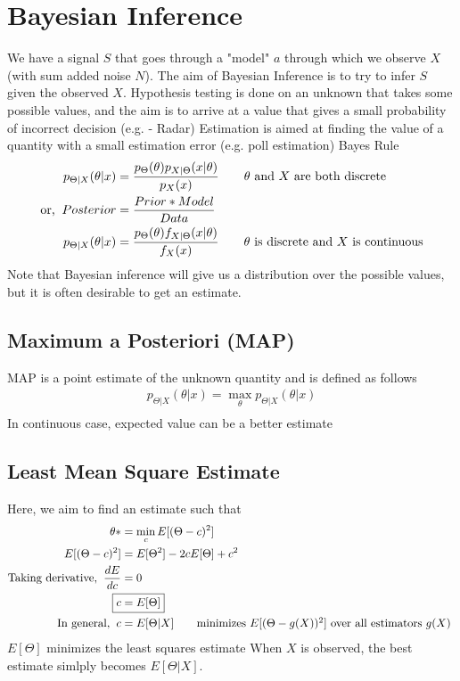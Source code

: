 \documentclass[11pt, a4paper]{article}
\begin{document}
    \section{Bayesian Inference}
    We have a signal $S$ that goes through a "model" $a$ through which we observe $X$ (with sum added noise $N$). The aim of Bayesian Inference is to try to infer $S$ given the observed $X$.
    \newline
    Hypothesis testing is done on an unknown that takes some possible values, and the aim is to arrive at a value that gives a small probability of incorrect decision (e.g. - Radar)
    \newline
    Estimation is aimed at finding the value of a quantity with a small estimation error (e.g. poll estimation)
    \newline
    Bayes Rule
    \begin{align*}
        p_{\Theta|X}(\theta|x) &= \frac{p_{\Theta}(\theta)p_{X|\Theta}(x|\theta)}{p_{X}(x)} \tag*{$\theta$ and $X$ are both discrete}\\
        \text{or,\;\;} Posterior &= \frac{Prior * Model}{Data}\\
        p_{\Theta|X}(\theta|x) &= \frac{p_{\Theta}(\theta)f_{X|\Theta}(x|\theta)}{f_{X}(x)} \tag*{$\theta$ is discrete and $X$ is continuous}\\
    \end{align*}
    Note that Bayesian inference will give us a distribution over the possible values, but it is often desirable to get an estimate.

    \subsection{Maximum a Posteriori (MAP)}
    MAP is a point estimate of the unknown quantity and is defined as follows
    \begin{align*}
        p_{\Theta|X}(\theta|x) = \max_{\theta}p_{\Theta|X}(\theta|x) \tag*{$\theta$ with maximum posterior probability}\\
    \end{align*}
    In continuous case, expected value can be a better estimate

    \subsection{Least Mean Square Estimate}
    Here, we aim to find an estimate such that
    \begin{align*}
        \theta* &= \min_{c} E[(\Theta - c)^{2}]\\
        E[(\Theta - c)^{2}] &= E[\Theta^{2}] - 2cE[\Theta] + c^{2}\\
        \text{Taking derivative,\;\;} \frac{dE}{dc} &= 0\\
        \Aboxed{c &= E[\Theta]}\\
        \text{In general,\;\;} c &= E[\Theta|X] \tag*{minimizes $E[(\Theta - g(X))^{2}]$ over all estimators $g(X)$ }
    \end{align*}
    $E[\Theta]$ minimizes the least squares estimate
    \newline
    When $X$ is observed, the best estimate simlply becomes $E[\Theta|X]$.
\end{document}
